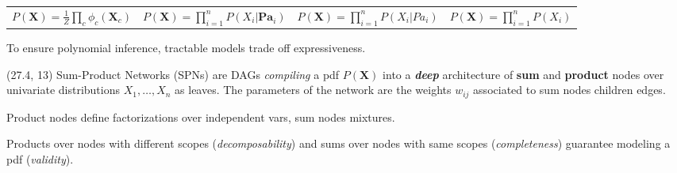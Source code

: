 \documentclass[final]{beamer}
\begin{document}
\begin{frame}{}
\begin{textblock}{25.2}
\begin{table}[!ht]
\begin{tabular}{c c c c}
        \tiny  $P(\mathbf{X})=\frac{1}{Z}\prod\limits_{c}\phi_{c}(\mathbf{X}_{c})$ & 
        \tiny  $P(\mathbf{X})=\prod\limits_{i=1}^nP(X_{i}|\mathbf{Pa}_{i})$&
        \tiny $P(\mathbf{X})=\prod\limits_{i=1}^nP(X_{i}|Pa_{i})$ &
        \tiny $P(\mathbf{X})=\prod\limits_{i=1}^nP(X_{i})$                                                              
      \end{tabular}\bigskip
      
    \end{table}

    To ensure polynomial inference, tractable models trade off
     expressiveness.
  \end{textblock}
  
  \begin{textblock}{25.2}(27.4, 13)
    \footnotesize
    Sum-Product Networks (SPNs) are DAGs
    \emph{compiling} a pdf $P(\mathbf{X})$ into a \textbf{\emph{deep}} architecture of \textbf{sum}
    and \textbf{product} nodes over univariate distributions $X_1,\dots,X_n$ as leaves.
    The parameters of the network are the weights $w_{ij}$ associated to sum
    nodes children edges.\par
    
    Product nodes define factorizations over independent vars, sum
    nodes mixtures.\par
    
    
    Products over nodes with different scopes (\emph{decomposability}) and
    sums over nodes with same scopes (\emph{completeness}) guarantee modeling
    a pdf (\emph{validity}).\par\bigskip
    

\end{textblock}
\end{frame}
\end{document}

